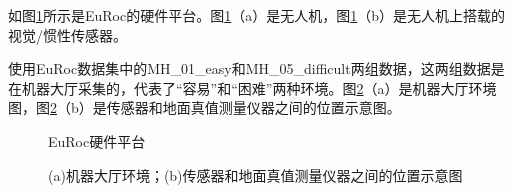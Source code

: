 如图\ref{fig5_1}所示是EuRoc的硬件平台。图\ref{fig5_1}（a）是无人机，图\ref{fig5_1}（b）是无人机上搭载的视觉/惯性传感器。

使用EuRoc数据集中的MH\_01\_easy和MH\_05\_difficult两组数据，这两组数据是在机器大厅采集的，代表了“容易”和“困难”两种环境。图\ref{fig5_2}（a）是机器大厅环境图，图\ref{fig5_2}（b）是传感器和地面真值测量仪器之间的位置示意图。
\begin{figure}[h]\setlength{\belowcaptionskip}{-12pt}
	\centering
	\hspace{0.5cm}
	\caption{EuRoc硬件平台} \label{fig5_1}
\end{figure}

\begin{figure}[h]\setlength{\belowcaptionskip}{-12pt}
	\centering
	\hspace{0.5cm}
	\caption{(a)机器大厅环境；(b)传感器和地面真值测量仪器之间的位置示意图} \label{fig5_2}
\end{figure}
